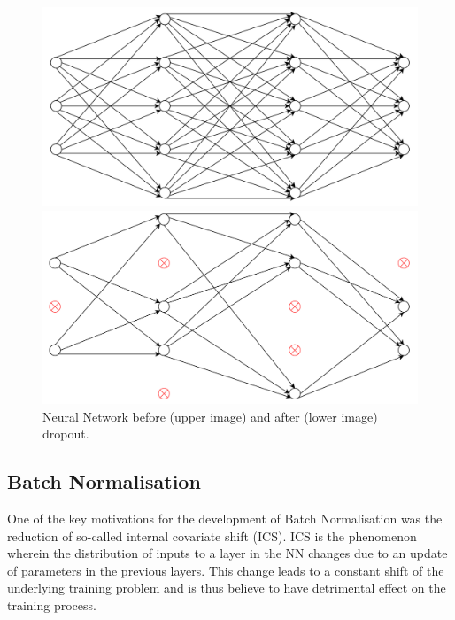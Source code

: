 \begin{figure}[H]
  \centering
  \includegraphics[scale=0.35]{Images/beforedrp.png}

  \bigskip

  \bigskip

  \includegraphics[scale=0.35]{Images/afterdrp.png}

  \bigskip

  \caption{Neural Network before (upper image) and after (lower image) dropout.}
  \label{dropout}
\end{figure}

\subsection{Batch Normalisation}


One of the key motivations for the development of Batch Normalisation was the reduction of so-called internal covariate shift (ICS). ICS is the phenomenon wherein the distribution of inputs to a layer in the NN changes due to an update of parameters in the previous layers. This change leads to a constant shift of the underlying training problem and is thus believe to have detrimental effect on the training process. \\

